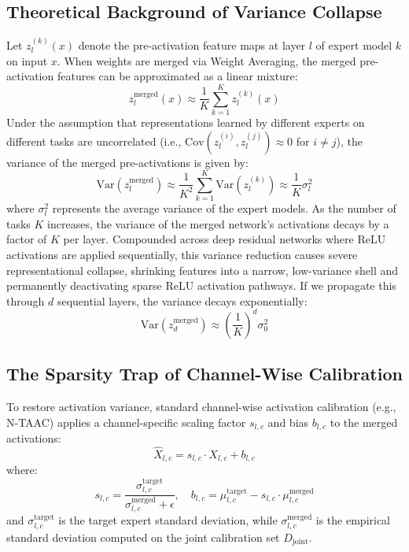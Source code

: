 \documentclass{article}
\begin{document}
\subsection{Theoretical Background of Variance Collapse}
Let $z_l^{(k)}(x)$ denote the pre-activation feature maps at layer $l$ of expert model $k$ on input $x$. When weights are merged via Weight Averaging, the merged pre-activation features can be approximated as a linear mixture:
\begin{equation}
z^{\text{merged}}_l(x) \approx \frac{1}{K} \sum_{k=1}^K z_l^{(k)}(x)
\end{equation}
Under the assumption that representations learned by different experts on different tasks are uncorrelated (i.e., $\text{Cov}(z_l^{(i)}, z_l^{(j)}) \approx 0$ for $i \ne j$), the variance of the merged pre-activations is given by:
\begin{equation}
\text{Var}(z^{\text{merged}}_l) \approx \frac{1}{K^2} \sum_{k=1}^K \text{Var}(z_l^{(k)}) \approx \frac{1}{K} \sigma_l^2
\end{equation}
where $\sigma_l^2$ represents the average variance of the expert models. As the number of tasks $K$ increases, the variance of the merged network's activations decays by a factor of $K$ per layer. Compounded across deep residual networks where ReLU activations are applied sequentially, this variance reduction causes severe representational collapse, shrinking features into a narrow, low-variance shell and permanently deactivating sparse ReLU activation pathways. If we propagate this through $d$ sequential layers, the variance decays exponentially:
\begin{equation}
\text{Var}(z_d^{\text{merged}}) \approx \left(\frac{1}{K}\right)^d \sigma_0^2
\end{equation}

\subsection{The Sparsity Trap of Channel-Wise Calibration}
To restore activation variance, standard channel-wise activation calibration (e.g., N-TAAC) applies a channel-specific scaling factor $s_{l,c}$ and bias $b_{l,c}$ to the merged activations:
\begin{equation}
\hat{X}_{l,c} = s_{l,c} \cdot X_{l,c} + b_{l,c}
\end{equation}
where:
\begin{equation}
s_{l,c} = \frac{\sigma^{\text{target}}_{l,c}}{\sigma^{\text{merged}}_{l,c} + \epsilon}, \quad b_{l,c} = \mu^{\text{target}}_{l,c} - s_{l,c} \cdot \mu^{\text{merged}}_{l,c}
\end{equation}
and $\sigma^{\text{target}}_{l,c}$ is the target expert standard deviation, while $\sigma^{\text{merged}}_{l,c}$ is the empirical standard deviation computed on the joint calibration set $D_{\text{joint}}$.
\end{document}
